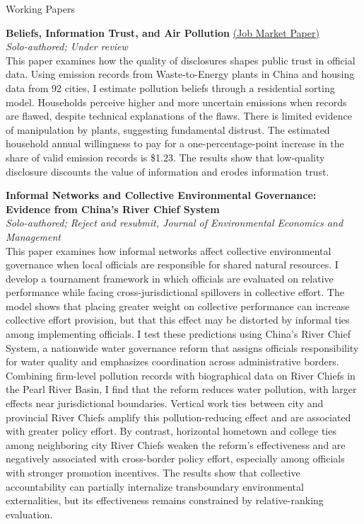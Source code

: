 \documentclass{resume} %
\begin{document}
	\begin{rSection}{Working Papers}
		
		\textbf{Beliefs, Information Trust, and Air Pollution} \quad \href{https://papers.ssrn.com/sol3/papers.cfm?abstract_id=5648090}{(Job Market Paper)} \\[2pt]
		\textit{Solo-authored; Under review} \\[5pt]
		This paper examines how the quality of disclosures shapes public trust in official data. Using emission records from Waste-to-Energy plants in China and housing data from 92 cities, I estimate pollution beliefs through a residential sorting model. Households perceive higher and more uncertain emissions when records are flawed, despite technical explanations of the flaws. There is limited evidence of manipulation by plants, suggesting fundamental distrust. The estimated household annual willingness to pay for a one-percentage-point increase in the share of valid emission records is \$1.23. The results show that low-quality disclosure discounts the value of information and erodes information trust.
		
		\textbf{Informal Networks and Collective Environmental Governance: Evidence from China's River Chief System} \\[2pt]
		\textit{Solo-authored; Reject and resubmit, Journal of Environmental Economics and Management} \\[5pt]
		This paper examines how informal networks affect collective environmental governance when local officials are responsible for shared natural resources. I develop a tournament framework in which officials are evaluated on relative performance while facing cross-jurisdictional spillovers in collective effort. The model shows that placing greater weight on collective performance can increase collective effort provision, but that this effect may be distorted by informal ties among implementing officials. I test these predictions using China's River Chief System, a nationwide water governance reform that assigns officials responsibility for water quality and emphasizes coordination across administrative borders. Combining firm-level pollution records with biographical data on River Chiefs in the Pearl River Basin, I find that the reform reduces water pollution, with larger effects near jurisdictional boundaries. Vertical work ties between city and provincial River Chiefs amplify this pollution-reducing effect and are associated with greater policy effort. By contrast, horizontal hometown and college ties among neighboring city River Chiefs weaken the reform's effectiveness and are negatively associated with cross-border policy effort, especially among officials with stronger promotion incentives. The results show that collective accountability can partially internalize transboundary environmental externalities, but its effectiveness remains constrained by relative-ranking evaluation.
		

\end{rSection}
\end{document}
